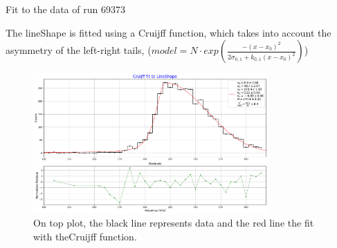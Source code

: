 \documentclass[8pt]{beamer}
\begin{document}
\begin{frame}{Fit to the data of run 69373}

The lineShape is fitted using a Cruijff function, which takes into account the asymmetry of the left-right tails, ($model = N \cdot exp(  \frac{-(x - x_{0})^2}{2\sigma_{0,1} + k_{0,1}(x - x_{0})^{2}})$) 

\begin{figure}[hbtp]
\centering
\includegraphics[width = 0.8\textwidth ]{../Plot/FitToLineShape.pdf}
\caption{On top plot, the black line represents data and the red line the fit with the\newline Cruijff function.}
\end{figure}
\end{frame}
\end{document}

